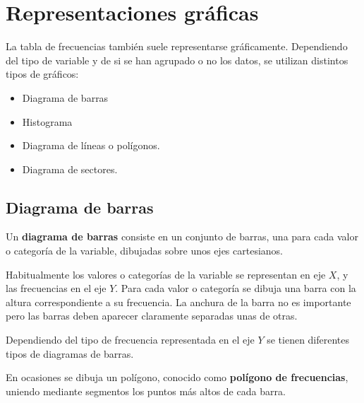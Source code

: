 \documentclass[
  a4paper,
]{scrreport}
\theoremstyle{definition}
\theoremstyle{definition}
\theoremstyle{plain}
\theoremstyle{remark}
\begin{document}
\hypertarget{representaciones-gruxe1ficas}{%
\section{Representaciones gráficas}\label{representaciones-gruxe1ficas}}

La tabla de frecuencias también suele representarse gráficamente.
Dependiendo del tipo de variable y de si se han agrupado o no los datos,
se utilizan distintos tipos de gráficos:

\begin{itemize}
\item
  Diagrama de barras
\item
  Histograma
\item
  Diagrama de líneas o polígonos.
\item
  Diagrama de sectores.
\end{itemize}

\hypertarget{diagrama-de-barras}{%
\subsection{Diagrama de barras}\label{diagrama-de-barras}}

Un \textbf{diagrama de barras} consiste en un conjunto de barras, una
para cada valor o categoría de la variable, dibujadas sobre unos ejes
cartesianos.

Habitualmente los valores o categorías de la variable se representan en
eje \(X\), y las frecuencias en el eje \(Y\). Para cada valor o
categoría se dibuja una barra con la altura correspondiente a su
frecuencia. La anchura de la barra no es importante pero las barras
deben aparecer claramente separadas unas de otras.

Dependiendo del tipo de frecuencia representada en el eje \(Y\) se
tienen diferentes tipos de diagramas de barras.

En ocasiones se dibuja un polígono, conocido como \textbf{polígono de
frecuencias}, uniendo mediante segmentos los puntos más altos de cada
barra.
\end{document}
